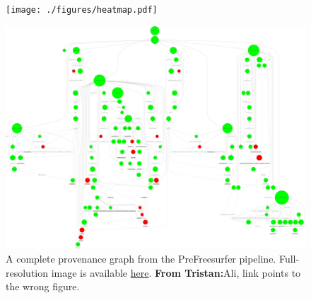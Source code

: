 \documentclass[a4paper,num-refs]{oup-contemporary}
\newcommand{\note}[2]{\color{blue}Note from \textsc{#1}: #2\color{black}}
\newcommand{\tristan}[1]{\color{orange}\textbf{From Tristan:}#1\color{black}}
\newcommand{\flirt}[0]{\texttt{flirt}\xspace}
\begin{document}
\begin{figure}
\begin{minipage}{\linewidth}
\centering
  \texttt{[image: ./figures/heatmap.pdf]}
  \caption{Heatmap of non-reproducible processes across PreFreeSurfer pipeline steps (N=20). 
  Each cell represents the occurrence of a particular command line in a
  pipeline step among Anatomical Average (AAve), Anterior/Posterior
  Commissure Alignment (ACPC-A), Brain Extraction (BExt), Bias Field
  Correction (BFC), or Atlas-Registration (AR). Cell labels indicate the
  number of subjects where the corresponding process appears. For example,
  the \flirt tool was invoked 6 times in step DC for each of the 20
  subjects: 2 instances weren't reproducible in 19 subjects, 3
  instances were always reproducible, and 1 instance wasn't reproducible in
  17 subjects. \note{Greg}{colorbar doesn't match the numbers: it's from 0-1 but the numbers are 
  subject counts. I don't really have a preference on which, but harmonizing them to be the same unit should happen.} \tristan{
    Ali, it looks like this figure is still unclear, and that other people may still misunderstand it. To better 
    show that the number is a number of subjects, I'd suggest to replace number "x" with "(n=x)",
    write it in smaller font size, and at the bottom-right of the cell instead of in the middle. 
  }
        }
  \label{fig:pfs_heatmap}
\end{minipage}

\vspace*{1cm}

\begin{minipage}{\linewidth}
  \centering
    \includegraphics[width=\linewidth]{figures/pfs-labeled.png} 
    \caption{A complete provenance graph from the PreFreesurfer pipeline.
     Full-resolution image is available 
     \href{https://drive.google.com/file/d/1BKq5ZXIVr3bkij88SmeW7ulWOExSCm7n/view?usp=sharing}{here}. \tristan{Ali, link points to the wrong figure.}}
    \label{fig:complete_pfs}
\end{minipage}
\end{figure}
\end{document}
